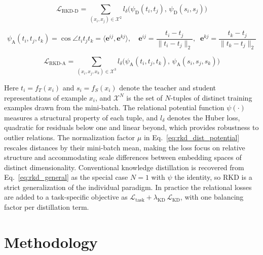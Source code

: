 \documentclass[11pt,letterpaper]{article}
\begin{document}
\begin{equation}
    \mathcal{L}_{\text{RKD-D}} =
    \sum_{(x_i,x_j)\in\mathcal{X}^2}
    l_{\delta}\big(\psi_{\text{D}}(t_i,t_j),\, \psi_{\text{D}}(s_i,s_j)\big)
    \label{eq:rkd_distance}
\end{equation}

\begin{equation}
    \psi_{\text{A}}(t_i,t_j,t_k) = \cos\angle t_i t_j t_k
    = \langle \mathbf{e}^{ij}, \mathbf{e}^{kj}\rangle,
    \quad
    \mathbf{e}^{ij} = \frac{t_i - t_j}{\lVert t_i - t_j\rVert_2},
    \;\;
    \mathbf{e}^{kj} = \frac{t_k - t_j}{\lVert t_k - t_j\rVert_2}
    \label{eq:rkd_angle_potential}
\end{equation}

\begin{equation}
    \mathcal{L}_{\text{RKD-A}} =
    \sum_{(x_i,x_j,x_k)\in\mathcal{X}^3}
    l_{\delta}\big(\psi_{\text{A}}(t_i,t_j,t_k),\, \psi_{\text{A}}(s_i,s_j,s_k)\big)
    \label{eq:rkd_angle}
\end{equation}

\noindent
Here $t_i = f_T(x_i)$ and $s_i = f_S(x_i)$ denote the teacher and student representations
of example $x_i$, and $\mathcal{X}^N$ is the set of $N$-tuples of distinct training
examples drawn from the mini-batch. The relational potential function $\psi(\cdot)$
measures a structural property of each tuple, and $l_{\delta}$ denotes the Huber loss,
quadratic for residuals below one and linear beyond, which provides robustness to outlier
relations. The normalization factor $\mu$ in Eq.~\ref{eq:rkd_dist_potential} rescales
distances by their mini-batch mean, making the loss focus on relative structure and
accommodating scale differences between embedding spaces of distinct dimensionality.
Conventional knowledge distillation is recovered from Eq.~\ref{eq:rkd_general} as the
special case $N{=}1$ with $\psi$ the identity, so RKD is a strict generalization of the
individual paradigm. In practice the relational losses are added to a task-specific
objective as $\mathcal{L}_{\text{task}} + \lambda_{\text{KD}}\,\mathcal{L}_{\text{KD}}$,
with one balancing factor per distillation term.

\section{Methodology}
\label{sec:methodology}
\end{document}
